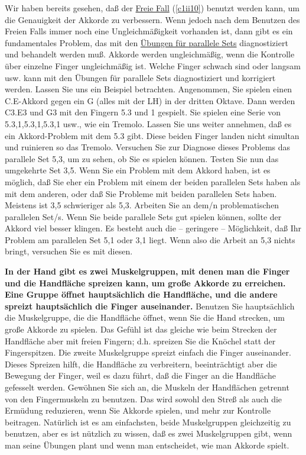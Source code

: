 Wir haben bereits gesehen, daß der \hyperref[c1ii10]{Freie Fall} (\autoref{c1ii10}) benutzt werden kann, um die Genauigkeit der Akkorde zu verbessern.
Wenn jedoch nach dem Benutzen des Freien Falls immer noch eine Ungleichmäßigkeit vorhanden ist, dann gibt es ein fundamentales Problem, das mit den \hyperref[c1iii7b]{Übungen für parallele Sets} diagnostiziert und behandelt werden muß.
Akkorde werden ungleichmäßig, wenn die Kontrolle über einzelne Finger ungleichmäßig ist.
Welche Finger schwach sind oder langsam usw. kann mit den Übungen für parallele Sets diagnostiziert und korrigiert werden.
Lassen Sie uns ein Beispiel betrachten.
Angenommen, Sie spielen einen C.E-Akkord gegen ein G (alles mit der LH) in der dritten Oktave.
Dann werden C3.E3 und G3 mit den Fingern 5.3 und 1 gespielt.
Sie spielen eine Serie von 5.3,1,5.3,1,5.3,1 usw., wie ein Tremolo.
Lassen Sie uns weiter annehmen, daß es ein Akkord-Problem mit dem 5.3 gibt.
Diese beiden Finger landen nicht simultan und ruinieren so das Tremolo.
Versuchen Sie zur Diagnose dieses Problems das parallele Set 5,3, um zu sehen, ob Sie es spielen können.
Testen Sie nun das umgekehrte Set 3,5.
Wenn Sie ein Problem mit dem Akkord haben, ist es möglich, daß Sie eher ein Problem mit einem der beiden parallelen Sets haben als mit dem anderen, oder daß Sie Probleme mit beiden parallelen Sets haben.
Meistens ist 3,5 schwieriger als 5,3.
Arbeiten Sie an dem/n problematischen parallelen Set/s.
Wenn Sie beide parallele Sets gut spielen können, sollte der Akkord viel besser klingen.
Es besteht auch die -- geringere -- Möglichkeit, daß Ihr Problem am parallelen Set 5,1 oder 3,1 liegt.
Wenn also die Arbeit an 5,3 nichts bringt, versuchen Sie es mit diesen.

\textbf{In der Hand gibt es zwei Muskelgruppen, mit denen man die Finger und die Handfläche spreizen kann, um große Akkorde zu erreichen.
Eine Gruppe öffnet hauptsächlich die Handfläche, und die andere spreizt hauptsächlich die Finger auseinander.}
Benutzen Sie hauptsächlich die Muskelgruppe, die die Handfläche öffnet, wenn Sie die Hand strecken, um große Akkorde zu spielen.
Das Gefühl ist das gleiche wie beim Strecken der Handfläche aber mit freien Fingern; d.h. spreizen Sie die Knöchel statt der Fingerspitzen.
Die zweite Muskelgruppe spreizt einfach die Finger auseinander.
Dieses Spreizen hilft, die Handfläche zu verbreitern, beeinträchtigt aber die Bewegung der Finger, weil es dazu führt, daß die Finger an die Handfläche gefesselt werden.
Gewöhnen Sie sich an, die Muskeln der Handflächen getrennt von den Fingermuskeln zu benutzen.
Das wird sowohl den Streß als auch die Ermüdung reduzieren, wenn Sie Akkorde spielen, und mehr zur Kontrolle beitragen.
Natürlich ist es am einfachsten, beide Muskelgruppen gleichzeitig zu benutzen, aber es ist nützlich zu wissen, daß es zwei Muskelgruppen gibt, wenn man seine Übungen plant und wenn man entscheidet, wie man Akkorde spielt.

